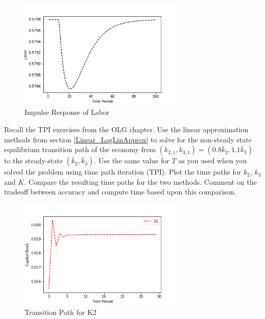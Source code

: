 \documentclass[letterpaper,11pt]{article}
\theoremstyle{definition}
\begin{document}
\begin{spacing}{1.5}
	\begin{figure}[H]
		\caption{Impulse Response of Labor}
		\label{fig:labor_impulse}
		\includegraphics[width=0.7\textwidth]{Laborimpulse.png}
	\end{figure}

	\begin{Exercise} \label{Linear_HW_OLG}
		Recall the TPI exercises from the OLG chapter.  Use the linear approximation methods from section \ref{Linear_LogLinApprox} to solve for the non-steady state equilibrium transition path of the economy from $(k_{2,1},k_{3,1})=(0.8\bar{k}_2,1.1\bar{k}_3)$ to the steady-state $(\bar{k}_2,\bar{k}_3)$. Use the same value for $T$ as you used when you solved the problem using time path iteration (TPI).  Plot the time paths for $k_2$, $k_3$ and $K$.  Compare the resulting time paths for the two methods.  Comment on the tradeoff between accuracy and compute time based upon this comparison.
	\end{Exercise}

	\begin{figure}[H]
		\caption{Transition Path for K2}
		\label{fig:k2_tpi}
		\includegraphics[width=0.7\textwidth]{k2TPI.png}
	\end{figure}


\end{spacing}
\end{document}
